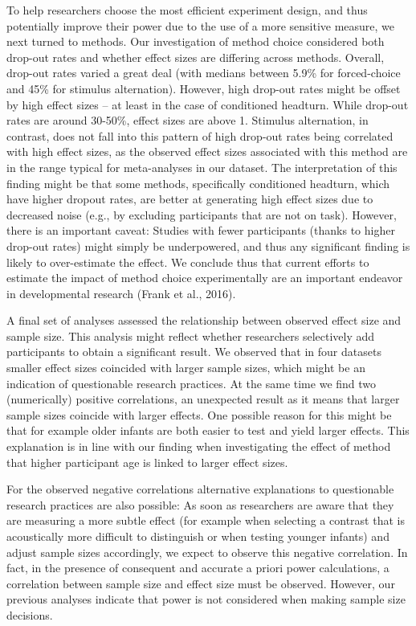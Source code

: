 \documentclass[english,floatsintext,man]{apa6}
\begin{document}
To help researchers choose the most efficient experiment design, and
thus potentially improve their power due to the use of a more sensitive
measure, we next turned to methods. Our investigation of method choice
considered both drop-out rates and whether effect sizes are differing
across methods. Overall, drop-out rates varied a great deal (with
medians between 5.9\% for forced-choice and 45\% for stimulus
alternation). However, high drop-out rates might be offset by high
effect sizes -- at least in the case of conditioned headturn. While
drop-out rates are around 30-50\%, effect sizes are above 1. Stimulus
alternation, in contrast, does not fall into this pattern of high
drop-out rates being correlated with high effect sizes, as the observed
effect sizes associated with this method are in the range typical for
meta-analyses in our dataset. The interpretation of this finding might
be that some methods, specifically conditioned headturn, which have
higher dropout rates, are better at generating high effect sizes due to
decreased noise (e.g., by excluding participants that are not on task).
However, there is an important caveat: Studies with fewer participants
(thanks to higher drop-out rates) might simply be underpowered, and thus
any significant finding is likely to over-estimate the effect. We
conclude thus that current efforts to estimate the impact of method
choice experimentally are an important endeavor in developmental
research (Frank et al., 2016).

A final set of analyses assessed the relationship between observed
effect size and sample size. This analysis might reflect whether
researchers selectively add participants to obtain a significant result.
We observed that in four datasets smaller effect sizes coincided with
larger sample sizes, which might be an indication of questionable
research practices. At the same time we find two (numerically) positive
correlations, an unexpected result as it means that larger sample sizes
coincide with larger effects. One possible reason for this might be that
for example older infants are both easier to test and yield larger
effects. This explanation is in line with our finding when investigating
the effect of method that higher participant age is linked to larger
effect sizes.

For the observed negative correlations alternative explanations to
questionable research practices are also possible: As soon as
researchers are aware that they are measuring a more subtle effect (for
example when selecting a contrast that is acoustically more difficult to
distinguish or when testing younger infants) and adjust sample sizes
accordingly, we expect to observe this negative correlation. In fact, in
the presence of consequent and accurate a priori power calculations, a
correlation between sample size and effect size must be observed.
However, our previous analyses indicate that power is not considered
when making sample size decisions.
\end{document}

